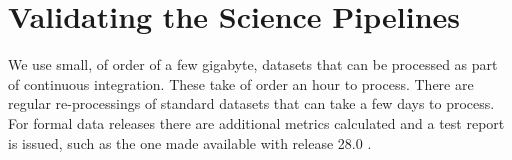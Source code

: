 \section{Validating the Science Pipelines}
\label{sec:validation}

We use small, of order of a few gigabyte, datasets that can be processed as part of continuous integration.
These take of order an hour to process.
There are regular re-processings of standard datasets that can take a few days to process.
For formal data releases there are additional metrics calculated and a test report is issued, such as the one made available with release 28.0 \citep{DMTR-451}.
